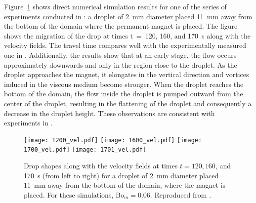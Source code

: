 Figure~\ref{fig:droplet_velocity} shows direct numerical simulation results 
for one of the series of experiments conducted in 
\cite{Mefford}: a droplet of 2~mm diameter placed 11~mm away
from the bottom of the domain where the permanent magnet is placed.
The figure shows the migration of the drop at times
t~=~120, 160, and 170~s  along with the velocity fields. 
The travel time compares well with the experimentally measured one in \cite{Mefford}.
Additionally, the results show that at an early stage, the flow occurs approximately downwards and 
only in the region close to the droplet. As the droplet approaches the magnet,
it elongates in the vertical direction and vortices induced in the viscous medium become stronger.
When the droplet reaches the bottom of the domain, the flow inside the droplet is pumped
outward from the center of the droplet, resulting in the flattening of the droplet
and consequently a decrease in the droplet height. These observations are consistent
with experiments in \cite{Mefford}.
\begin{figure}
\begin{center}
\texttt{[image: 1200\_vel.pdf]}
\texttt{[image: 1600\_vel.pdf]}
\texttt{[image: 1700\_vel.pdf]}
\texttt{[image: 1701\_vel.pdf]}
\end{center}
\caption{Drop shapes along with the velocity fields at times $t=120, 160$, and 170~s (from left to right) 
for a droplet of 2~mm diameter placed 11~mm away from the bottom of the domain,
where the magnet is placed. For these simulations, $\mbox{Bo}_m = 0.06$. Reproduced from \cite{ARRRP}.} \label{fig:droplet_velocity}
\end{figure}


